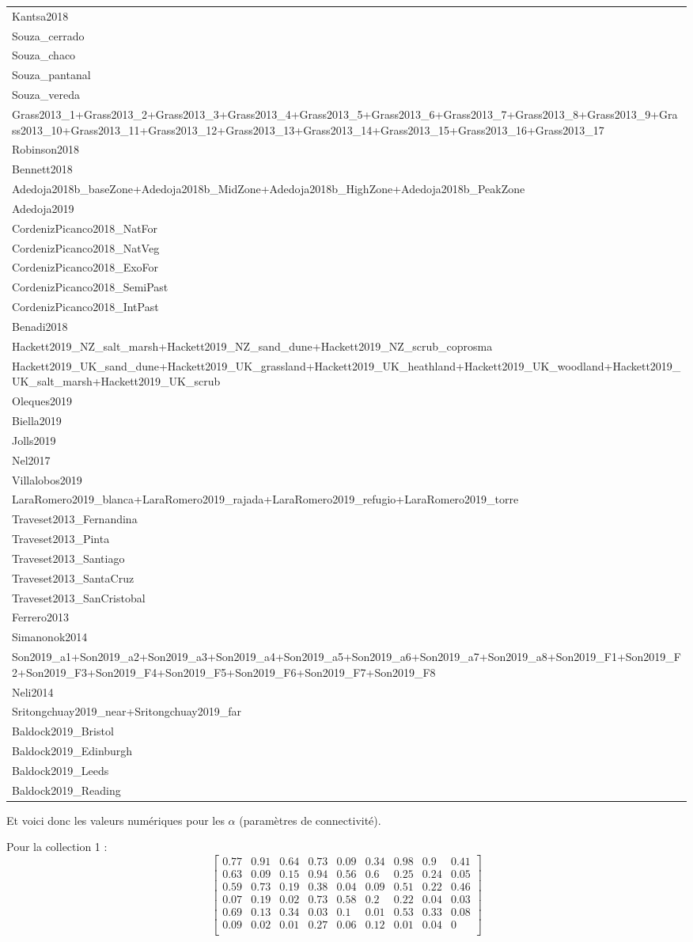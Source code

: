 \begin{longtable}[]{@{}l@{}}
Kantsa2018\tabularnewline
Souza\_cerrado\tabularnewline
Souza\_chaco\tabularnewline
Souza\_pantanal\tabularnewline
Souza\_vereda\tabularnewline
Grass2013\_1+Grass2013\_2+Grass2013\_3+Grass2013\_4+Grass2013\_5+Grass2013\_6+Grass2013\_7+Grass2013\_8+Grass2013\_9+Grass2013\_10+Grass2013\_11+Grass2013\_12+Grass2013\_13+Grass2013\_14+Grass2013\_15+Grass2013\_16+Grass2013\_17\tabularnewline
Robinson2018\tabularnewline
Bennett2018\tabularnewline
Adedoja2018b\_baseZone+Adedoja2018b\_MidZone+Adedoja2018b\_HighZone+Adedoja2018b\_PeakZone\tabularnewline
Adedoja2019\tabularnewline
CordenizPicanco2018\_NatFor\tabularnewline
CordenizPicanco2018\_NatVeg\tabularnewline
CordenizPicanco2018\_ExoFor\tabularnewline
CordenizPicanco2018\_SemiPast\tabularnewline
CordenizPicanco2018\_IntPast\tabularnewline
Benadi2018\tabularnewline
Hackett2019\_NZ\_salt\_marsh+Hackett2019\_NZ\_sand\_dune+Hackett2019\_NZ\_scrub\_coprosma\tabularnewline
Hackett2019\_UK\_sand\_dune+Hackett2019\_UK\_grassland+Hackett2019\_UK\_heathland+Hackett2019\_UK\_woodland+Hackett2019\_UK\_salt\_marsh+Hackett2019\_UK\_scrub\tabularnewline
Oleques2019\tabularnewline
Biella2019\tabularnewline
Jolls2019\tabularnewline
Nel2017\tabularnewline
Villalobos2019\tabularnewline
LaraRomero2019\_blanca+LaraRomero2019\_rajada+LaraRomero2019\_refugio+LaraRomero2019\_torre\tabularnewline
Traveset2013\_Fernandina\tabularnewline
Traveset2013\_Pinta\tabularnewline
Traveset2013\_Santiago\tabularnewline
Traveset2013\_SantaCruz\tabularnewline
Traveset2013\_SanCristobal\tabularnewline
Ferrero2013\tabularnewline
Simanonok2014\tabularnewline
Son2019\_a1+Son2019\_a2+Son2019\_a3+Son2019\_a4+Son2019\_a5+Son2019\_a6+Son2019\_a7+Son2019\_a8+Son2019\_F1+Son2019\_F2+Son2019\_F3+Son2019\_F4+Son2019\_F5+Son2019\_F6+Son2019\_F7+Son2019\_F8\tabularnewline
Neli2014\tabularnewline
Sritongchuay2019\_near+Sritongchuay2019\_far\tabularnewline
Baldock2019\_Bristol\tabularnewline
Baldock2019\_Edinburgh\tabularnewline
Baldock2019\_Leeds\tabularnewline
Baldock2019\_Reading\tabularnewline
\bottomrule
\end{longtable}

Et voici donc les valeurs numériques pour les \(\alpha\) (paramètres de
connectivité).

Pour la collection 1 :
\[\begin{bmatrix} 0.77 &0.91 &0.64 &0.73 &0.09 &0.34 &0.98 &0.9 &0.41 \\0.63 &0.09 &0.15 &0.94 &0.56 &0.6 &0.25 &0.24 &0.05 \\0.59 &0.73 &0.19 &0.38 &0.04 &0.09 &0.51 &0.22 &0.46 \\0.07 &0.19 &0.02 &0.73 &0.58 &0.2 &0.22 &0.04 &0.03 \\0.69 &0.13 &0.34 &0.03 &0.1 &0.01 &0.53 &0.33 &0.08 \\0.09 &0.02 &0.01 &0.27 &0.06 &0.12 &0.01 &0.04 &0 \\ \end{bmatrix}\]

